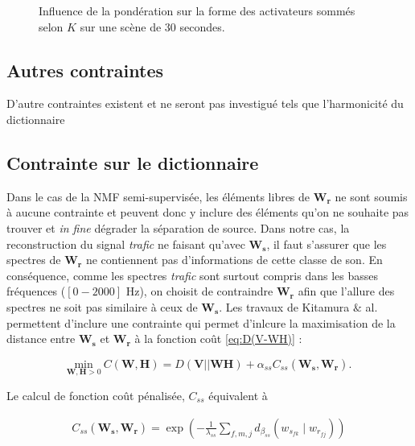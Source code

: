 \begin{figure}[hbtp]
\centering
\caption{Influence de la pondération sur la forme des activateurs sommés selon $K$ sur une scène de 30 secondes.}
\label{fig:smoothnessExample}
\end{figure}

\subsection{Autres contraintes}

D'autre contraintes existent et ne seront pas investigué tels que l'harmonicité du dictionnaire


\subsection{Contrainte sur le dictionnaire}

Dans le cas de la NMF semi-supervisée, les éléments libres de $\mathbf{W_r}$ ne sont soumis à aucune contrainte et peuvent donc y inclure des éléments qu'on ne souhaite pas trouver et \textit{in fine} dégrader la séparation de source. Dans notre cas, la reconstruction du signal \textit{trafic} ne faisant qu'avec $\mathbf{W_s}$, il faut s'assurer que les spectres de $\mathbf{W_r}$ ne contiennent pas d'informations de cette classe de son. En conséquence, comme les spectres \textit{trafic} sont surtout compris dans les basses fréquences ($\left[0-2000 \right]$ Hz), on choisit  de contraindre $\mathbf{W_r}$ afin que l'allure des spectres ne soit pas similaire à ceux de $\mathbf{W_s}$. Les travaux de Kitamura $\&$ al. \cite{kitamura} permettent d'inclure une contrainte qui permet d'inlcure la maximisation de la distance entre $\mathbf{W_s}$ et $\mathbf{W_r}$ à la fonction coût \ref{eq:D(V-WH)} : 

\begin{equation}
\underset{\mathbf{W}, \mathbf{H} > 0}{\text{min}}~ C(\mathbf{W},\mathbf{H}) = D(\mathbf{V}\vert\vert \mathbf{WH}) + \alpha_{ss} C_{ss}(\mathbf{W_s},\mathbf{W_r}).
\end{equation}

Le calcul de fonction coût pénalisée, $C_{ss}$ équivalent à  

\begin{align}
C_{ss}(\mathbf{W_s},\mathbf{W_r}) = \exp\left(-\frac{1}{\lambda_{ss}}\sum_{f,m,j}d_{\beta_{ss}}(w_{s_{fk}} \mid w_{r_{fj}})\right)
\end{align}

